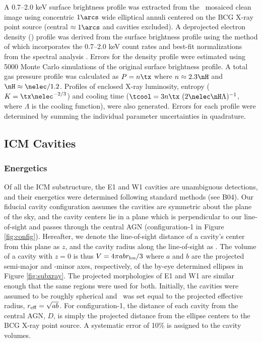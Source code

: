 \documentclass[11pt, preprint]{aastex}
\begin{document}
A 0.7--2.0 keV surface brightness profile was extracted from the
\cxo\ mosaiced clean image using concentric $1\arcs$ wide elliptical
annuli centered on the BCG X-ray point source (central $\approx
1\arcs$ and cavities excluded). A deprojected electron density
(\nelec) profile was derived from the surface brightness profile using
the method of \citet{kriss83} which incorporates the 0.7--2.0 keV
count rates and best-fit normalizations from the spectral analysis
\citep[see][for details]{accept}. Errors for the density profile were
estimated using 5000 Monte Carlo simulations of the original surface
brightness profile. A total gas pressure profile was calculated as $P
= n \tx$ where $n \approx 2.3 \nH$ and $\nH \approx
\nelec/1.2$. Profiles of enclosed X-ray luminosity, entropy ($K = \tx
\nelec^{-2/3}$) and cooling time ($\tcool = 3 n \tx~(2 \nelec \nH
\Lambda)^{-1}$, where $\Lambda$ is the cooling function), were also
generated. Errors for each profile were determined by summing the
individual parameter uncertainties in quadrature.

\subsection{ICM Cavities}
\label{sec:cavities}

\subsubsection{Energetics}
\label{sec:ecav}

Of all the ICM substructure, the E1 and W1 cavities are unambiguous
detections, and their energetics were determined following standard
methods (see B04). Our fiducial cavity configuration assumes the
cavities are symmetric about the plane of the sky, and the cavity
centers lie in a plane which is perpendicular to our line-of-sight and
passes through the central AGN (configuration-1 in Figure
\ref{fig:config}). Hereafter, we denote the line-of-sight distance of
a cavity's center from this plane as $z$, and the cavity radius along
the line-of-sight as \rlos. The volume of a cavity with $z = 0$ is
thus $V = 4\pi a b r_{\rm{los}}/3$ where $a$ and $b$ are the projected
semi-major and -minor axes, respectively, of the by-eye determined
ellipses in Figure \ref{fig:subxray}. The projected morphologies of E1
and W1 are similar enough that the same regions were used for
both. Initially, the cavities were assumed to be roughly spherical and
\rlos\ was set equal to the projected effective radius, $r_{\rm{eff}} =
\sqrt{ab}$. For configuration-1, the distance of each cavity from the
central AGN, $D$, is simply the projected distance from the ellipse
centers to the BCG X-ray point source. A systematic error of 10\% is
assigned to the cavity volumes.
\end{document}
